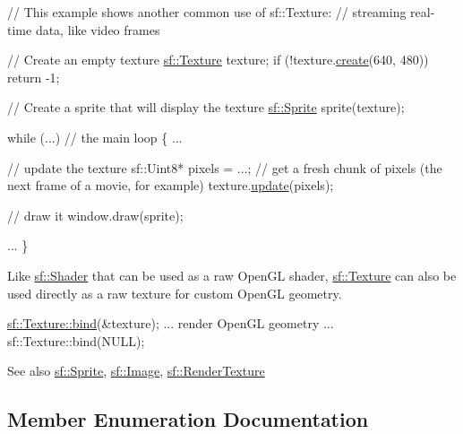 \begin{DoxyCode}
\textcolor{comment}{// This example shows another common use of sf::Texture:}
\textcolor{comment}{// streaming real-time data, like video frames}

\textcolor{comment}{// Create an empty texture}
\hyperlink{classsf_1_1_texture}{sf::Texture} texture;
\textcolor{keywordflow}{if} (!texture.\hyperlink{classsf_1_1_texture_a89b4c7d204acf1033c3a1b6e0a3ad0a3}{create}(640, 480))
    \textcolor{keywordflow}{return} -1;

\textcolor{comment}{// Create a sprite that will display the texture}
\hyperlink{classsf_1_1_sprite}{sf::Sprite} sprite(texture);

\textcolor{keywordflow}{while} (...) \textcolor{comment}{// the main loop}
\{
    ...

    \textcolor{comment}{// update the texture}
    sf::Uint8* pixels = ...; \textcolor{comment}{// get a fresh chunk of pixels (the next frame of a movie, for example)}
    texture.\hyperlink{classsf_1_1_texture_ae4eab5c6781316840b0c50ad08370963}{update}(pixels);

    \textcolor{comment}{// draw it}
    window.draw(sprite);

    ...
\}
\end{DoxyCode}


Like \hyperlink{classsf_1_1_shader}{sf\+::\+Shader} that can be used as a raw Open\+GL shader, \hyperlink{classsf_1_1_texture}{sf\+::\+Texture} can also be used directly as a raw texture for custom Open\+GL geometry. 
\begin{DoxyCode}
\hyperlink{classsf_1_1_texture_ae9a4274e7b95ebf7244d09c7445833b0}{sf::Texture::bind}(&texture);
... render OpenGL geometry ...
sf::Texture::bind(NULL);
\end{DoxyCode}


\begin{DoxySeeAlso}{See also}
\hyperlink{classsf_1_1_sprite}{sf\+::\+Sprite}, \hyperlink{classsf_1_1_image}{sf\+::\+Image}, \hyperlink{classsf_1_1_render_texture}{sf\+::\+Render\+Texture} 
\end{DoxySeeAlso}


\subsection{Member Enumeration Documentation}
\mbox{\label{classsf_1_1_texture_aa6fd3bbe3c334b3c4428edfb2765a82e}} 
